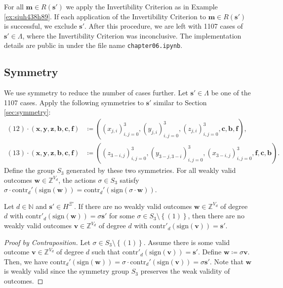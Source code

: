 For all \( \mathbf{m} \in R(\mathbf{s}') \) we apply the Invertibility Criterion as in Example \ref{ex:siuh438h89}. If each application of the Invertibility Criterion to \( \mathbf{m} \in R(\mathbf{s}') \) is successful, we exclude \( \mathbf{s}' \). After this procedure, we are left with 1107 cases of \( \mathbf{s}' \in \Lambda \), where the Invertibility Criterion was inconclusive. The implementation details are public in \cite{ducrepo} under the file name \texttt{chapter06.ipynb}.

\subsection{Symmetry}

We use symmetry to reduce the number of cases further. Let \( \mathbf{s}' \in \Lambda \) be one of the 1107 cases. Apply the following symmetries to \( \mathbf{s}' \) similar to Section \ref{sec:symmetry}:
\begin{align*}
    (12) \cdot (\mathbf{x}, \mathbf{y}, \mathbf{z}, \mathbf{b}, \mathbf{c}, \mathbf{f}) &\coloneqq ((x_{j,i})_{i,j=0}^3, (y_{j,i})_{i,j=0}^3, (z_{j,i})_{i,j=0}^3, \mathbf{c}, \mathbf{b}, \mathbf{f}), \\
    (13) \cdot (\mathbf{x}, \mathbf{y}, \mathbf{z}, \mathbf{b}, \mathbf{c}, \mathbf{f}) &\coloneqq ((z_{3-i,j})_{i,j=0}^3, (y_{3-j,3-i})_{i,j=0}^3, (x_{3-i,j})_{i,j=0}^3, \mathbf{f}, \mathbf{c}, \mathbf{b}).
\end{align*}
Define the group \( S_3 \) generated by these two symmetries. For all weakly valid outcomes \( \mathbf{w} \in \mathbb{Z}^{V_d} \), the actions \( \sigma \in S_3 \) satisfy \( \sigma \cdot \mathrm{contr}_d'(\mathrm{sign}(\mathbf{w})) = \mathrm{contr}_d'(\mathrm{sign}(\sigma \cdot \mathbf{w})) \).

\begin{proposition}
    Let \( d \in \mathbb{N} \) and \( \mathbf{s}' \in H^{\Xi'} \). If there are no weakly valid outcomes \( \mathbf{w} \in \mathbb{Z}^{V_d} \) of degree \( d \) with \( \mathrm{contr}'_{d}(\mathrm{sign}(\mathbf{w})) = \sigma \mathbf{s}' \) for some \( \sigma \in S_3 \setminus \left\{ (1) \right\} \), then there are no weakly valid outcomes \( \mathbf{v} \in \mathbb{Z}^{V_d} \) of degree \( d \) with \( \mathrm{contr}'_{d}(\mathrm{sign}(\mathbf{v})) = \mathbf{s}' \).
\end{proposition}

\begin{proof}[Proof by Contraposition]
    Let \( \sigma \in S_3 \setminus \left\{ (1) \right\} \).
    Assume there is some valid outcome \( \mathbf{v} \in \mathbb{Z}^{V_d} \) of degree \( d \) such that \( \mathrm{contr}'_d(\mathrm{sign}(\mathbf{v})) = \mathbf{s}' \). Define \( \mathbf{w} \coloneqq \sigma \mathbf{v} \). Then, we have \( \mathrm{contr}_d'(\mathrm{sign}( \mathbf{w})) =  \sigma \cdot \mathrm{contr}_d'(\mathrm{sign}(\mathbf{v}))  = \sigma \mathbf{s}'\). Note that \( \mathbf{w} \) is weakly valid since the symmetry group \( S_3 \) preserves the weak validity of outcomes.
\end{proof}

